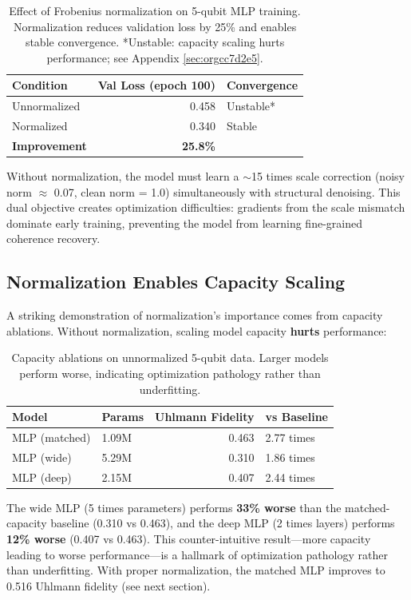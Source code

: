 \documentclass[11pt]{article}
\begin{document}
\begin{table}[htbp]
\caption{\label{tab:orgb21798c}Effect of Frobenius normalization on 5-qubit MLP training. Normalization reduces validation loss by 25\% and enables stable convergence. *Unstable: capacity scaling hurts performance; see Appendix \ref{sec:orgcc7d2e5}.}
\centering
\begin{tabular}{lrl}
Condition & Val Loss (epoch 100) & Convergence\\[0pt]
\hline
Unnormalized & 0.458 & Unstable*\\[0pt]
Normalized & 0.340 & Stable\\[0pt]
\textbf{Improvement} & \textbf{25.8\%} & \\[0pt]
\end{tabular}
\end{table}

Without normalization, the model must learn a \(\sim\)15 times scale correction (noisy norm \(\approx\) 0.07, clean norm = 1.0) simultaneously with structural denoising. This dual objective creates optimization difficulties: gradients from the scale mismatch dominate early training, preventing the model from learning fine-grained coherence recovery.

\subsection{Normalization Enables Capacity Scaling}
\label{sec:org4572639}

A striking demonstration of normalization's importance comes from capacity ablations. Without normalization, scaling model capacity \textbf{hurts} performance:

\begin{table}[htbp]
\caption{\label{tab:orgc90edb4}Capacity ablations on unnormalized 5-qubit data. Larger models perform worse, indicating optimization pathology rather than underfitting.}
\centering
\begin{tabular}{llrl}
Model & Params & Uhlmann Fidelity & vs Baseline\\[0pt]
\hline
MLP (matched) & 1.09M & 0.463 & 2.77 times\\[0pt]
MLP (wide) & 5.29M & 0.310 & 1.86 times\\[0pt]
MLP (deep) & 2.15M & 0.407 & 2.44 times\\[0pt]
\end{tabular}
\end{table}

The wide MLP (5 times parameters) performs \textbf{33\% worse} than the matched-capacity baseline (0.310 vs 0.463), and the deep MLP (2 times layers) performs \textbf{12\% worse} (0.407 vs 0.463). This counter-intuitive result---more capacity leading to worse performance---is a hallmark of optimization pathology rather than underfitting. With proper normalization, the matched MLP improves to 0.516 Uhlmann fidelity (see next section).
\end{document}
